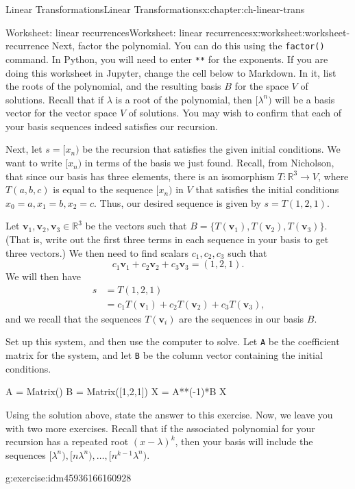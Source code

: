 \documentclass[oneside,10pt,]{book}
\newcommand{\mono}[1]{\texttt{#1}}
\numberwithin{equation}{section}
\newcommand{\R}{\mathbb{R}}
\newcommand{\vv}{\mathbf{v}}
\newcommand{\amp}{&}
\begin{document}
\begin{chapterptx}{Linear Transformations}{}{Linear Transformations}{}{}{x:chapter:ch-linear-trans}
\begin{worksheet-section}{Worksheet: linear recurrences}{}{Worksheet: linear recurrences}{}{}{x:worksheet:worksheet-recurrence}
Next, factor the polynomial. You can do this using the \mono{factor()} command. In Python, you will need to enter \mono{**} for the exponents.%
If you are doing this worksheet in Jupyter, change the cell below to Markdown. In it, list the roots of the polynomial, and the resulting basis \(B\) for the space \(V\) of solutions. Recall that if \(\lambda\) is a root of the polynomial, then \([\lambda^n)\) will be a basis vector for the vector space \(V\) of solutions. You may wish to confirm that each of your basis sequences indeed satisfies our recursion.%
\par
Next, let \(s=[x_n)\) be the recursion that satisfies the given initial conditions. We want to write \([x_n)\) in terms of the basis we just found. Recall, from Nicholson, that since our basis has three elements, there is an isomorphism \(T:\R^3\to V\), where \(T(a,b,c)\) is equal to the sequence \([x_n)\) in \(V\) that satisfies the initial conditions \(x_0=a, x_1=b, x_2=c\). Thus, our desired sequence is given by \(s=T(1,2,1)\).%
\par
Let \(\vv_1, \vv_2, \vv_3\in\R^3\) be the vectors such that \(B=\{T(\vv_1), T(\vv_2), T(\vv_3)\}\). (That is, write out the first three terms in each sequence in your basis to get three vectors.) We then need to find scalars \(c_1,c_2,c_3\) such that%
\begin{equation*}
c_1\vv_1+c_2\vv_2+c_3\vv_3=(1,2,1)\text{.}
\end{equation*}
We will then have%
\begin{align*}
s \amp = T(1,2,1)\\
\amp = c_1T(\vv_1)+c_2T(\vv_2)+c_3T(\vv_3)\text{,}
\end{align*}
and we recall that the sequences \(T(\vv_i)\) are the sequences in our basis \(B\).%
\par
Set up this system, and then use the computer to solve. Let \mono{A} be the coefficient matrix for the system, and let \mono{B} be the column vector containing the initial conditions.%
\begin{sageinput}
A = Matrix()
B = Matrix([1,2,1])
X = A**(-1)*B
X
\end{sageinput}
Using the solution above, state the answer to this exercise.%
Now, we leave you with two more exercises. Recall that if the associated polynomial for your recursion has a repeated root \((x-\lambda)^k\), then your basis will include the sequences \([\lambda^n), [n\lambda^n), \ldots, [n^{k-1}\lambda^n)\).%
\begin{divisionexercise}{2}{}{}{g:exercise:idm45936166160928}%

\end{divisionexercise}
\end{worksheet-section}
\end{chapterptx}
\end{document}
